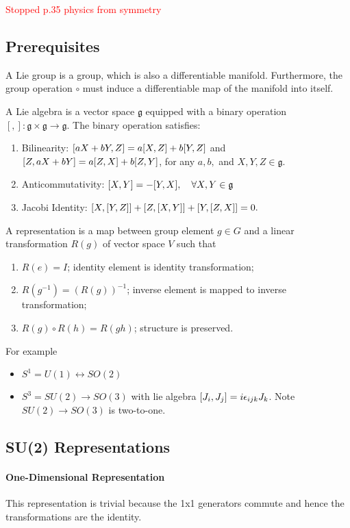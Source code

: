 \documentclass{article}
\begin{document}
\textcolor{red}{Stopped p.35 physics from symmetry}

\subsection{Prerequisites}


 A Lie group is a group, which is also a differentiable manifold. Furthermore, the group operation $\circ$ must induce a differentiable map of the manifold into itself. 

 A Lie algebra is a vector space $\mathfrak g$ equipped with a binary operation $[,]:\mathfrak g\times\mathfrak g\to\mathfrak g$. The binary operation satisfies:
\begin{enumerate}
    \item Bilinearity: $\comm{aX+bY}{Z}=a\comm{X}{Z}+b\comm{Y}{Z}$ and $\comm{Z}{aX+bY}=a\comm{Z}{X}+b\comm{Z}{Y}$, for any $a,b,$ and $X,Y,Z\in\mathfrak{g}$.
    \item Anticommutativity: $\comm{X}{Y}=-\comm{Y}{X},\quad\forall X,Y\in\mathfrak{g}$
    \item Jacobi Identity: $\comm{X}{\comm{Y}{Z}}+\comm{Z}{\comm{X}{Y}}+\comm{Y}{\comm{Z}{X}}=0.$
\end{enumerate}

 A representation is a map between group element $g\in G$ and a linear transformation $R(g)$ of vector space $V$ such that 
\begin{enumerate}
    \item $R(e)=I$; identity element is identity transformation;
    \item $R(g^{-1})=(R(g))^{-1}$; inverse element is mapped to inverse transformation;
    \item $R(g)\circ R(h)=R(gh)$; structure is preserved.
\end{enumerate}

\example For example
\begin{itemize}
    \item $S^1=U(1)\leftrightarrow SO(2)$
    \item $S^3=SU(2)\rightarrow SO(3)$ with lie algebra $\comm{J_i}{J_j}=i\epsilon_{ijk}J_k$. Note $SU(2)\rightarrow SO(3)$ is two-to-one.
\end{itemize}

\subsection{SU(2) Representations}
\paragraph{One-Dimensional Representation}
This representation is trivial because the 1x1 generators commute and hence the transformations are the identity.
\end{document}
